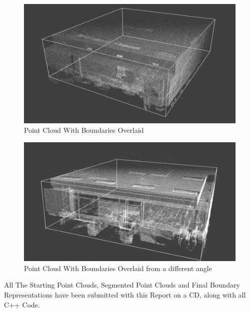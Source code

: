 \begin{figure}[H]
\centering
\includegraphics[width=1\linewidth]{Includes/images/Appendix/bound1}
\caption{Point Cloud With Boundaries Overlaid}
\label{fig:bound1}
\end{figure}
\begin{figure}[H]
\centering
\includegraphics[width=1\linewidth]{Includes/images/Appendix/bound2}
\caption{Point Cloud With Boundaries Overlaid from a different angle}
\label{fig:bound2}
\end{figure}

All The Starting Point Clouds, Segmented Point Clouds and Final Boundary Representations have been submitted with this Report on a CD, along with all C++ Code.


